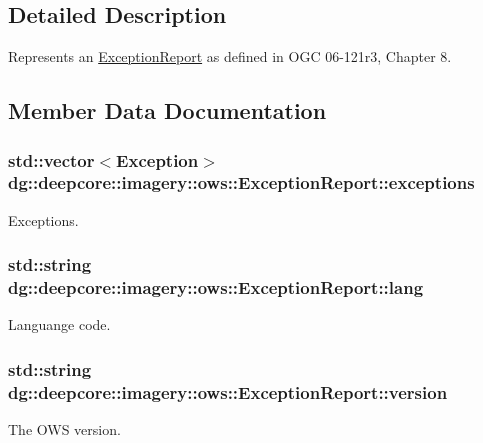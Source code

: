 \subsection{Detailed Description}
Represents an \hyperlink{structdg_1_1deepcore_1_1imagery_1_1ows_1_1_exception_report}{Exception\+Report} as defined in O\+GC 06-\/121r3, Chapter 8. 

\subsection{Member Data Documentation}
\subsubsection[{\texorpdfstring{exceptions}{exceptions}}]{\setlength{\rightskip}{0pt plus 5cm}std\+::vector$<${\bf Exception}$>$ dg\+::deepcore\+::imagery\+::ows\+::\+Exception\+Report\+::exceptions}\hypertarget{structdg_1_1deepcore_1_1imagery_1_1ows_1_1_exception_report_ae1a4d944b177a13ddb4253ab8bbbc979}{}\label{structdg_1_1deepcore_1_1imagery_1_1ows_1_1_exception_report_ae1a4d944b177a13ddb4253ab8bbbc979}


Exceptions. 

\subsubsection[{\texorpdfstring{lang}{lang}}]{\setlength{\rightskip}{0pt plus 5cm}std\+::string dg\+::deepcore\+::imagery\+::ows\+::\+Exception\+Report\+::lang}\hypertarget{structdg_1_1deepcore_1_1imagery_1_1ows_1_1_exception_report_a3cc19f5f1be081777526f2f32872f787}{}\label{structdg_1_1deepcore_1_1imagery_1_1ows_1_1_exception_report_a3cc19f5f1be081777526f2f32872f787}


Languange code. 

\subsubsection[{\texorpdfstring{version}{version}}]{\setlength{\rightskip}{0pt plus 5cm}std\+::string dg\+::deepcore\+::imagery\+::ows\+::\+Exception\+Report\+::version}\hypertarget{structdg_1_1deepcore_1_1imagery_1_1ows_1_1_exception_report_aee7406892476149864fb6a4d683b8dbc}{}\label{structdg_1_1deepcore_1_1imagery_1_1ows_1_1_exception_report_aee7406892476149864fb6a4d683b8dbc}


The O\+WS version. 

